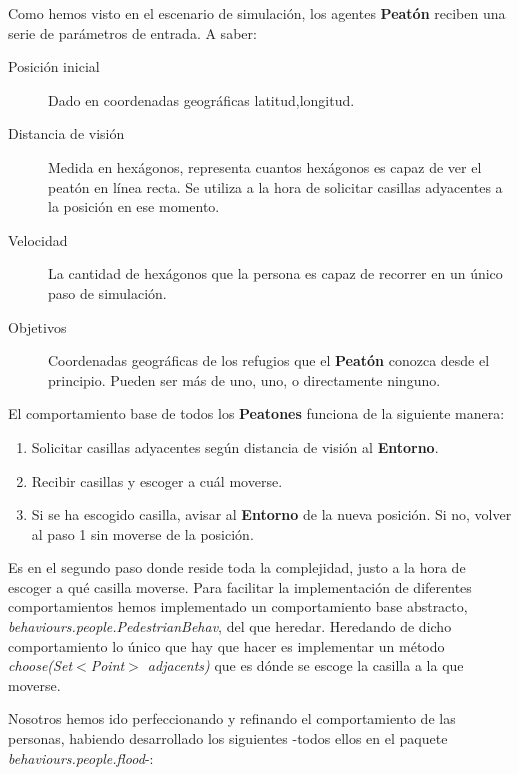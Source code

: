 Como hemos visto en el escenario de simulación, los agentes {\bf Peatón}
reciben una serie de parámetros de entrada. A saber:

\begin{description}
 \item[Posición inicial] Dado en coordenadas geográficas latitud,longitud.
 \item[Distancia de visión] Medida en hexágonos, representa cuantos hexágonos
 es capaz de ver el peatón en línea recta. Se utiliza a la hora de solicitar
 casillas adyacentes a la posición en ese momento.
 \item[Velocidad] La cantidad de hexágonos que la persona es capaz de recorrer
 en un único paso de simulación.
 \item[Objetivos] Coordenadas geográficas de los refugios que el {\bf Peatón}
 conozca desde el principio. Pueden ser más de uno, uno, o directamente ninguno.
\end{description}

El comportamiento base de todos los {\bf Peatones} funciona de la siguiente
manera:

\begin{enumerate}
 \item Solicitar casillas adyacentes según distancia de visión al {\bf Entorno}.
 \item Recibir casillas y escoger a cuál moverse.
 \item Si se ha escogido casilla, avisar al {\bf Entorno} de la nueva posición.
 Si no, volver al paso 1 sin moverse de la posición.
\end{enumerate}

Es en el segundo paso donde reside toda la complejidad, justo a la hora de
escoger a qué casilla moverse. Para facilitar la implementación de diferentes
comportamientos hemos implementado un comportamiento base abstracto, {\em
behaviours.people.PedestrianBehav}, del que heredar. Heredando de dicho
comportamiento lo único que hay que hacer es implementar un método {\em
choose(Set$<$Point$>$ adjacents)} que es dónde se escoge la casilla a la que
moverse.

Nosotros hemos ido perfeccionando y refinando el comportamiento de las
personas, habiendo desarrollado los siguientes -todos ellos en el paquete {\em
behaviours.people.flood}-:

